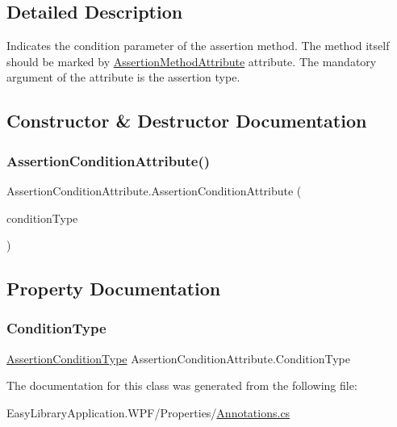 \subsection{Detailed Description}
Indicates the condition parameter of the assertion method. The method itself should be marked by \mbox{\hyperlink{class_assertion_method_attribute}{Assertion\+Method\+Attribute}} attribute. The mandatory argument of the attribute is the assertion type. 



\subsection{Constructor \& Destructor Documentation}
\mbox{\label{class_assertion_condition_attribute_a9e8e78b2fe91bb29f18154940860af32}} 
\subsubsection{\texorpdfstring{Assertion\+Condition\+Attribute()}{AssertionConditionAttribute()}}
{\footnotesize\ttfamily Assertion\+Condition\+Attribute.\+Assertion\+Condition\+Attribute (\begin{DoxyParamCaption}\item[{\mbox{\hyperlink{_annotations_8cs_a016c132b1d3a6c75524ade006560e87d}{Assertion\+Condition\+Type}}}]{condition\+Type }\end{DoxyParamCaption})}



\subsection{Property Documentation}
\mbox{\label{class_assertion_condition_attribute_ad07b5dd15df52a5c307ed41dda8299ef}} 
\subsubsection{\texorpdfstring{Condition\+Type}{ConditionType}}
{\footnotesize\ttfamily \mbox{\hyperlink{_annotations_8cs_a016c132b1d3a6c75524ade006560e87d}{Assertion\+Condition\+Type}} Assertion\+Condition\+Attribute.\+Condition\+Type\hspace{0.3cm}{\ttfamily [get]}}



The documentation for this class was generated from the following file\+:\begin{DoxyCompactItemize}
\item 
Easy\+Library\+Application.\+W\+P\+F/\+Properties/\mbox{\hyperlink{_annotations_8cs}{Annotations.\+cs}}\end{DoxyCompactItemize}
